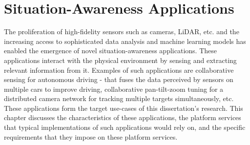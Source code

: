 \chapter{Situation-Awareness Applications}
\label{sec:apps}

The proliferation of high-fidelity sensors such as cameras, LiDAR, etc. and the increasing access to sophisticated data analysis and machine learning models has enabled the emergence of novel situation-awareness applications. These applications interact with the physical environment by sensing and extracting relevant information from it. Examples of such applications are collaborative sensing for autonomous driving - that fuses the data perceived by sensors on multiple cars to improve driving, collaborative pan-tilt-zoom tuning for a distributed camera network for tracking multiple targets simultaneously, etc. These applications form the target use-cases of this dissertation's research. This chapter discusses the characteristics of these applications, the platform services that typical implementations of such applications would rely on, and the specific requirements that they impose on these platform services.
